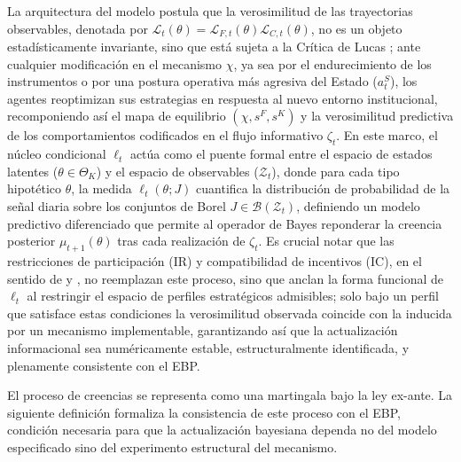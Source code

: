 \documentclass[review,authoryear,12pt]{elsarticle}
\theoremstyle{plain}
\theoremstyle{definition}
\newcommand{\ThetaK}{\Theta_K}
\newcommand{\1}{\mathbf{1}}
\begin{document}
La arquitectura del modelo postula que la verosimilitud de las trayectorias observables, denotada por $\mathcal{L}_t(\theta)=\mathcal{L}_{F,t}(\theta)\mathcal{L}_{C,t}(\theta)$, no es un objeto estadísticamente invariante, sino que está sujeta a la Crítica de Lucas \citeyearpar{Lucas1976}; ante cualquier modificación en el mecanismo $\chi$, ya sea por el endurecimiento de los instrumentos o por una postura operativa más agresiva del Estado ($a_t^S$), los agentes reoptimizan sus estrategias en respuesta al nuevo entorno institucional, recomponiendo así el mapa de equilibrio $(\chi, s^F, s^K)$ y la verosimilitud predictiva de los comportamientos codificados en el flujo informativo $\zeta_t$. En este marco, el núcleo condicional $\ell_t$ actúa como el puente formal entre el espacio de estados latentes ($\theta \in \ThetaK$) y el espacio de observables ($\mathcal{Z}_t$), donde para cada tipo hipotético $\theta$, la medida $\ell_t(\theta; J)$ cuantifica la distribución de probabilidad de la señal diaria sobre los conjuntos de Borel $J \in \mathcal{B}(\mathcal{Z}_t)$, definiendo un modelo predictivo diferenciado que permite al operador de Bayes reponderar la creencia posterior $\mu_{t+1}(\theta)$ tras cada realización de $\zeta_t$. Es crucial notar que las restricciones de participación (IR) y compatibilidad de incentivos (IC), en el sentido de \citet{Myerson1979IC} y \citet{BoltonDewatripont2005}, no reemplazan este proceso, sino que anclan la forma funcional de $\ell_t$ al restringir el espacio de perfiles estratégicos admisibles; solo bajo un perfil que satisface estas condiciones la verosimilitud observada coincide con la inducida por un mecanismo implementable, garantizando así que la actualización informacional sea numéricamente estable, estructuralmente identificada, y plenamente consistente con el EBP.

El proceso de creencias se representa como una martingala bajo la ley ex-ante. La siguiente definición formaliza la consistencia de este proceso con el EBP, condición necesaria para que la actualización bayesiana dependa no del modelo especificado sino del experimento estructural del mecanismo.
\end{document}
